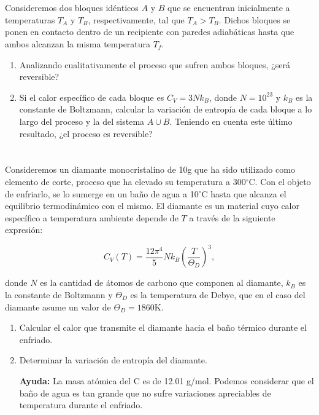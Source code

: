 \documentclass[a4paper,11pt]{article}
\begin{document}
\section{}

Consideremos dos bloques idénticos $A$ y $B$ que se encuentran 
inicialmente a temperaturas $T_A$ y $T_B$, respectivamente, tal que 
$T_A > T_B$. Dichos bloques se ponen en contacto dentro de un 
recipiente con paredes adiabáticas hasta que ambos alcanzan la misma 
temperatura $T_f$.

\begin{enumerate}[label=(\alph*),
                  leftmargin=2\parindent,
                  rightmargin=2\parindent]

    \item{Analizando cualitativamente el proceso que sufren ambos 
          bloques, ¿será reversible?}
    
    \item{Si el calor específico de cada bloque es $C_V = 3 N k_B$,
          donde $N = 10^{23}$ y $k_B$ es la constante de Boltzmann, 
          calcular la variación de entropía de cada bloque a lo largo 
          del proceso y la del sistema $A \cup B$. 
          Teniendo en cuenta este último resultado, ¿el proceso es 
          reversible?}

\end{enumerate}


\section{}

Consideremos un diamante monocristalino de 10g que ha sido utilizado 
como elemento de corte, proceso que ha elevado su temperatura a 
300$^\circ$C.
Con el objeto de enfriarlo, se lo sumerge en un baño de agua a 
10$^\circ$C hasta que alcanza el equilibrio termodinámico con el mismo.
El diamante es un material cuyo calor específico a temperatura 
ambiente depende de $T$ a través de la siguiente expresión:

$$ C_V(T) = \frac{12\pi^4}{5} N k_B \left( \frac{T}{\Theta_D} \right)^3, $$

\noindent donde $N$ es la cantidad de átomos de carbono que componen 
al diamante, $k_B$ es la constante de Boltzmann y $\Theta_D$ es la 
temperatura de Debye, que en el caso del diamante asume un valor de 
$\Theta_D = 1860$K.

\begin{enumerate}[label=(\alph*),
                  leftmargin=2\parindent,
                  rightmargin=2\parindent]

    \item{Calcular el calor que transmite el diamante hacia el baño 
          térmico durante el enfriado.}
    
    \item{Determinar la variación de entropía del diamante.}
    
    {\small
    \textbf{Ayuda:}
    La masa atómica del C es de 12.01 g/mol.
    Podemos considerar que el baño de agua es tan grande que no sufre 
    variaciones apreciables de temperatura durante el enfriado.
    }

\end{enumerate}
\end{document}
